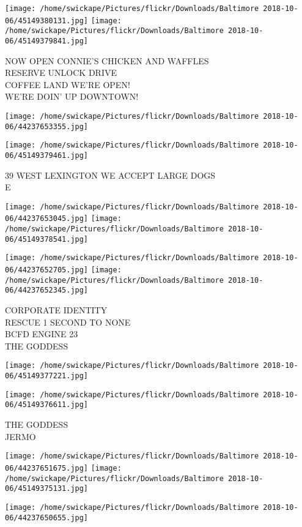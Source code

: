 \documentclass[10pt,letterpaper]{article}
\begin{document}
\texttt{[image: /home/swickape/Pictures/flickr/Downloads/Baltimore 2018-10-06/45149380131.jpg]}
\texttt{[image: /home/swickape/Pictures/flickr/Downloads/Baltimore 2018-10-06/45149379841.jpg]}

NOW OPEN CONNIE'S CHICKEN AND WAFFLES\\
RESERVE UNLOCK DRIVE\\
COFFEE LAND WE'RE OPEN!\\
WE'RE DOIN' UP DOWNTOWN!
\pagebreak

\texttt{[image: /home/swickape/Pictures/flickr/Downloads/Baltimore 2018-10-06/44237653355.jpg]}

\vspace{0.25in}
\texttt{[image: /home/swickape/Pictures/flickr/Downloads/Baltimore 2018-10-06/45149379461.jpg]}

39 WEST LEXINGTON WE ACCEPT LARGE DOGS\\
E
\pagebreak

\texttt{[image: /home/swickape/Pictures/flickr/Downloads/Baltimore 2018-10-06/44237653045.jpg]}
\texttt{[image: /home/swickape/Pictures/flickr/Downloads/Baltimore 2018-10-06/45149378541.jpg]}

\texttt{[image: /home/swickape/Pictures/flickr/Downloads/Baltimore 2018-10-06/44237652705.jpg]}
\texttt{[image: /home/swickape/Pictures/flickr/Downloads/Baltimore 2018-10-06/44237652345.jpg]}

CORPORATE IDENTITY\\
RESCUE 1 SECOND TO NONE\\
BCFD ENGINE 23\\
THE GODDESS
\pagebreak

\texttt{[image: /home/swickape/Pictures/flickr/Downloads/Baltimore 2018-10-06/45149377221.jpg]}

\vspace{0.25in}
\texttt{[image: /home/swickape/Pictures/flickr/Downloads/Baltimore 2018-10-06/45149376611.jpg]}

THE GODDESS\\
JERMO
\pagebreak

\texttt{[image: /home/swickape/Pictures/flickr/Downloads/Baltimore 2018-10-06/44237651675.jpg]}
\texttt{[image: /home/swickape/Pictures/flickr/Downloads/Baltimore 2018-10-06/45149375131.jpg]}

\texttt{[image: /home/swickape/Pictures/flickr/Downloads/Baltimore 2018-10-06/44237650655.jpg]}
\end{document}
